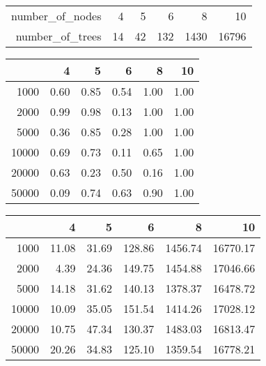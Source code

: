 \begin{table}[ht]
\begin{center}
\begin{tabular}{rrrrrr}
  \hline
  number\_of\_nodes & 4 & 5 & 6 & 8 & 10 \\ 
  number\_of\_trees & 14 & 42 & 132 & 1430 & 16796 \\ 
  \hline
\end{tabular}
\end{center}
\end{table}
\begin{table}[ht]
\begin{center}
\begin{tabular}{rrrrrr}
  \hline
 & 4 & 5 & 6 & 8 & 10 \\ 
  \hline
1000 & 0.60 & 0.85 & 0.54 & 1.00 & 1.00 \\ 
  2000 & 0.99 & 0.98 & 0.13 & 1.00 & 1.00 \\ 
  5000 & 0.36 & 0.85 & 0.28 & 1.00 & 1.00 \\ 
  10000 & 0.69 & 0.73 & 0.11 & 0.65 & 1.00 \\ 
  20000 & 0.63 & 0.23 & 0.50 & 0.16 & 1.00 \\ 
  50000 & 0.09 & 0.74 & 0.63 & 0.90 & 1.00 \\ 
   \hline
\end{tabular}
\end{center}
\end{table}
\begin{table}[ht]
\begin{center}
\begin{tabular}{rrrrrr}
  \hline
 & 4 & 5 & 6 & 8 & 10 \\ 
  \hline
1000 & 11.08 & 31.69 & 128.86 & 1456.74 & 16770.17 \\ 
  2000 & 4.39 & 24.36 & 149.75 & 1454.88 & 17046.66 \\ 
  5000 & 14.18 & 31.62 & 140.13 & 1378.37 & 16478.72 \\ 
  10000 & 10.09 & 35.05 & 151.54 & 1414.26 & 17028.12 \\ 
  20000 & 10.75 & 47.34 & 130.37 & 1483.03 & 16813.47 \\ 
  50000 & 20.26 & 34.83 & 125.10 & 1359.54 & 16778.21 \\ 
   \hline
\end{tabular}
\end{center}
\end{table}
